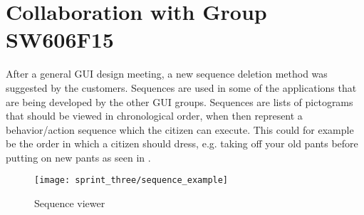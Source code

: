 \section{Collaboration with Group SW606F15}
\label{sec:collaboration_with_group_sw606f15}

After a general GUI design meeting, a new sequence deletion method was suggested by the customers. Sequences are used in some of the applications that are being developed by the other GUI groups. Sequences are lists of pictograms that should be viewed in chronological order, when then represent a behavior/action sequence which the citizen can execute. This could for example be the order in which a citizen should dress, e.g. taking off your old pants before putting on new pants as seen in .

\begin{figure}[!htbp]
	\centering
	\texttt{[image: sprint\_three/sequence\_example]}
	\caption{Sequence viewer}
	\label{fig:sequence_example}
\end{figure}


